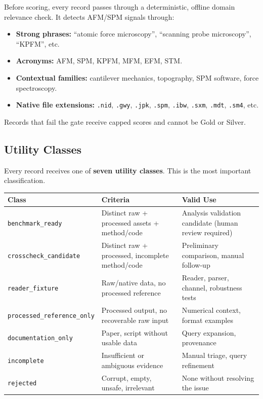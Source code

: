 \documentclass[11pt,a4paper]{article}
\begin{document}
Before scoring, every record passes through a deterministic, offline domain relevance check. It detects AFM/SPM signals through:

\begin{itemize}[nosep]
  \item \textbf{Strong phrases:} ``atomic force microscopy'', ``scanning probe microscopy'', ``KPFM'', etc.
  \item \textbf{Acronyms:} AFM, SPM, KPFM, MFM, EFM, STM.
  \item \textbf{Contextual families:} cantilever mechanics, topography, SPM software, force spectroscopy.
  \item \textbf{Native file extensions:} \texttt{.nid}, \texttt{.gwy}, \texttt{.jpk}, \texttt{.spm}, \texttt{.ibw}, \texttt{.sxm}, \texttt{.mdt}, \texttt{.sm4}, etc.
\end{itemize}

Records that fail the gate receive capped scores and cannot be Gold or Silver.

\subsection{Utility Classes}

Every record receives one of \textbf{seven utility classes}. This is the most important classification.

\begin{center}
\begin{tabularx}{\linewidth}{l>{\RaggedRight\arraybackslash}p{5cm}>{\RaggedRight\arraybackslash}X}
\toprule
\textbf{Class} & \textbf{Criteria} & \textbf{Valid Use} \\
\midrule
\texttt{benchmark\_ready} & Distinct raw + processed assets + method/code & Analysis validation candidate (human review required) \\
\texttt{crosscheck\_candidate} & Distinct raw + processed, incomplete method/code & Preliminary comparison, manual follow-up \\
\texttt{reader\_fixture} & Raw/native data, no processed reference & Reader, parser, channel, robustness tests \\
\texttt{processed\_reference\_only} & Processed output, no recoverable raw input & Numerical context, format examples \\
\texttt{documentation\_only} & Paper, script without usable data & Query expansion, provenance \\
\texttt{incomplete} & Insufficient or ambiguous evidence & Manual triage, query refinement \\
\texttt{rejected} & Corrupt, empty, unsafe, irrelevant & None without resolving the issue \\
\bottomrule
\end{tabularx}
\end{center}
\end{document}
